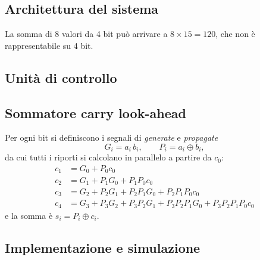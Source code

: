 \subsection{Architettura del sistema}

\begin{attenzione}
	La somma di 8 valori da 4 bit può arrivare a $8 \times 15 = 120$, che non è
	rappresentabile su 4 bit. 
\end{attenzione}

\subsection{Unità di controllo}

\subsection{Sommatore carry look-ahead}

Per ogni bit si definiscono i segnali di \emph{generate} e \emph{propagate}
\begin{equation}
	G_i = a_i\, b_i, \qquad P_i = a_i \oplus b_i,
\end{equation}
da cui tutti i riporti si calcolano in parallelo a partire da $c_0$:
\begin{align}
	c_1 &= G_0 + P_0 c_0 \\
	c_2 &= G_1 + P_1 G_0 + P_1 P_0 c_0 \\
	c_3 &= G_2 + P_2 G_1 + P_2 P_1 G_0 + P_2 P_1 P_0 c_0 \\
	c_4 &= G_3 + P_3 G_2 + P_3 P_2 G_1 + P_3 P_2 P_1 G_0 + P_3 P_2 P_1 P_0 c_0
\end{align}
e la somma è $s_i = P_i \oplus c_i$.


\subsection{Implementazione e simulazione}


